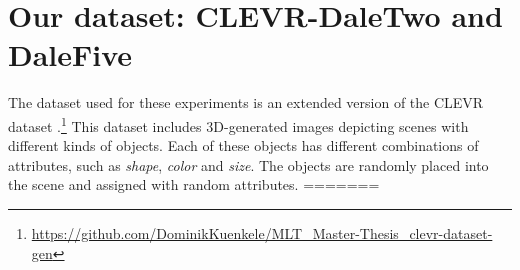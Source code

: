 \documentclass[11pt]{article}
\begin{document}

\section{Our dataset: CLEVR-DaleTwo and DaleFive}


The dataset used for these experiments is an extended version of the CLEVR dataset \citep{Johnson2016}.\footnote{%
  \href{https://github.com/DominikKuenkele/MLT\_Master-Thesis\_clevr-dataset-gen}{https://github.com/DominikKuenkele/MLT\_Master-Thesis\_clevr-dataset-gen}}
This dataset includes 3D-generated images depicting scenes with different kinds of objects. Each of these objects has different combinations of attributes, such as \emph{shape}, \emph{color} and \emph{size}. The objects are randomly placed into the scene and assigned with random attributes.
=======
\end{document}
